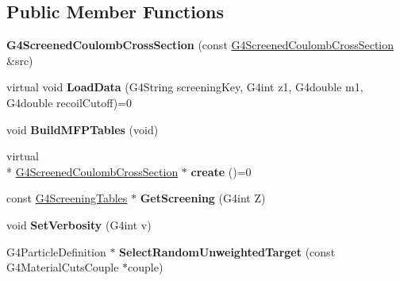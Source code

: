 \subsection*{Public Member Functions}
\begin{DoxyCompactItemize}
\item 
\hypertarget{classG4ScreenedCoulombCrossSection_a59e0eca08ea23847ea01fab7c7f2a98c}{{\bfseries G4\-Screened\-Coulomb\-Cross\-Section} (const \hyperlink{classG4ScreenedCoulombCrossSection}{G4\-Screened\-Coulomb\-Cross\-Section} \&src)}\label{classG4ScreenedCoulombCrossSection_a59e0eca08ea23847ea01fab7c7f2a98c}

\item 
\hypertarget{classG4ScreenedCoulombCrossSection_a36f7010b3075c363a96c037b018cdfa5}{virtual void {\bfseries Load\-Data} (G4\-String screening\-Key, G4int z1, G4double m1, G4double recoil\-Cutoff)=0}\label{classG4ScreenedCoulombCrossSection_a36f7010b3075c363a96c037b018cdfa5}

\item 
\hypertarget{classG4ScreenedCoulombCrossSection_a21351e02c8b9eccdea7ae30f2e7db3fe}{void {\bfseries Build\-M\-F\-P\-Tables} (void)}\label{classG4ScreenedCoulombCrossSection_a21351e02c8b9eccdea7ae30f2e7db3fe}

\item 
\hypertarget{classG4ScreenedCoulombCrossSection_a381cca52e9ba2c41cb838474334629ce}{virtual \\*
\hyperlink{classG4ScreenedCoulombCrossSection}{G4\-Screened\-Coulomb\-Cross\-Section} $\ast$ {\bfseries create} ()=0}\label{classG4ScreenedCoulombCrossSection_a381cca52e9ba2c41cb838474334629ce}

\item 
\hypertarget{classG4ScreenedCoulombCrossSection_accbe78a66a124161bd938c5fa1217d2a}{const \hyperlink{structG4ScreeningTables}{G4\-Screening\-Tables} $\ast$ {\bfseries Get\-Screening} (G4int Z)}\label{classG4ScreenedCoulombCrossSection_accbe78a66a124161bd938c5fa1217d2a}

\item 
\hypertarget{classG4ScreenedCoulombCrossSection_a8aff8c06482b63d344883107bf1a93d4}{void {\bfseries Set\-Verbosity} (G4int v)}\label{classG4ScreenedCoulombCrossSection_a8aff8c06482b63d344883107bf1a93d4}

\item 
\hypertarget{classG4ScreenedCoulombCrossSection_ab072a5e6932cf49bd8c2e24512dcf78f}{G4\-Particle\-Definition $\ast$ {\bfseries Select\-Random\-Unweighted\-Target} (const G4\-Material\-Cuts\-Couple $\ast$couple)}\label{classG4ScreenedCoulombCrossSection_ab072a5e6932cf49bd8c2e24512dcf78f}


\end{DoxyCompactItemize}
